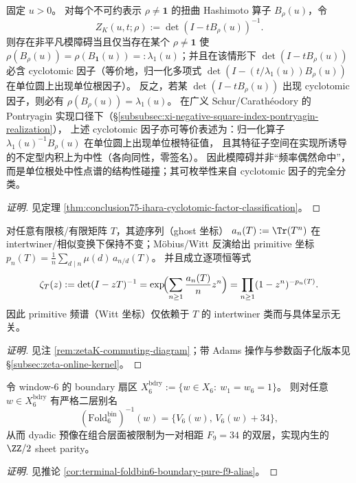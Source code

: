\begin{conclusion}\label{con:xi-terminal-mod-obstruction-cyclotomic}
固定 \(u>0\)。
对每个不可约表示 \(\rho\neq\mathbf 1\) 的扭曲 Hashimoto 算子 \(B_\rho(u)\)，令
\[
Z_K(u,t;\rho):=\det(I-tB_\rho(u))^{-1}.
\]
则存在非平凡模障碍当且仅当存在某个 \(\rho\neq\mathbf 1\) 使 \(\rho(B_\rho(u))=\rho(B_{\mathbf 1}(u))=:\lambda_1(u)\)；并且在该情形下 \(\det(I-tB_\rho(u))\) 必含 cyclotomic 因子（等价地，归一化多项式 \(\det(I-(t/\lambda_1(u))B_\rho(u))\) 在单位圆上出现单位根因子）。
反之，若某 \(\det(I-tB_\rho(u))\) 出现 cyclotomic 因子，则必有 \(\rho(B_\rho(u))=\lambda_1(u)\)。
在广义 Schur/Carath\'eodory 的 Pontryagin 实现口径下（\S\ref{subsubsec:xi-negative-square-index-pontryagin-realization}），
上述 cyclotomic 因子亦可等价表述为：归一化算子 \(\lambda_1(u)^{-1}B_\rho(u)\) 在单位圆上出现单位根特征值，
且其特征子空间在实现所诱导的不定型内积上为中性（各向同性，零签名）。
因此模障碍并非“频率偶然命中”，而是单位根处中性点谱的结构性碰撞；其可枚举性来自 cyclotomic 因子的完全分类。
\end{conclusion}
\begin{proof}[证明]
见定理 \ref{thm:conclusion75-ihara-cyclotomic-factor-classification}。
\end{proof}

\begin{conclusion}[Big-Witt/necklace 桥包的严格交换与函子性：\texorpdfstring{$\zeta=\mathrm{Euler}\circ\mathrm{Mob}\circ\mathrm{TrSeq}$}{zeta=Euler o Mob o TrSeq}]\label{con:xi-terminal-big-witt-functoriality}
对任意有限核/有限矩阵 \(T\)，其迹序列（ghost 坐标）
\(
a_n(T):=\Tr(T^n)
\)
在 intertwiner/相似变换下保持不变；Möbius/Witt 反演给出 primitive 坐标 \(p_n(T)=\frac1n\sum_{d\mid n}\mu(d)\,a_{n/d}(T)\)。
并且成立逐项恒等式
\[
\zeta_T(z):=\det(I-zT)^{-1}
=\exp\!\Bigl(\sum_{n\ge 1}\frac{a_n(T)}{n}z^n\Bigr)
=\prod_{n\ge 1}(1-z^n)^{-p_n(T)}.
\]
因此 primitive 频谱（Witt 坐标）仅依赖于 \(T\) 的 intertwiner 类而与具体呈示无关。
\end{conclusion}
\begin{proof}[证明]
见注 \ref{rem:zetaK-commuting-diagram}；带 Adams 操作与参数函子化版本见 \S\ref{subsec:zeta-online-kernel}。
\end{proof}

\begin{conclusion}[window-\(6\) 边界态的 \texorpdfstring{$\ZZ/2$}{Z/2} sheet parity：二层别名门户由 \texorpdfstring{$F_9=34$}{F9=34} 唯一承载]\label{con:xi-terminal-window6-bdry-sheet-parity}
令 window-\(6\) 的 boundary 扇区
\(
X^{\mathrm{bdry}}_6:=\{w\in X_6:\ w_1=w_6=1\}
\)。
则对任意 \(w\in X^{\mathrm{bdry}}_6\) 有严格二层别名
\[
(\mathrm{Fold}^{\mathrm{bin}}_6)^{-1}(w)=\{V_6(w),\,V_6(w)+34\},
\]
从而 dyadic 预像在组合层面被限制为一对相距 \(F_9=34\) 的双层，实现内生的 \(\ZZ/2\) sheet parity。
\end{conclusion}
\begin{proof}[证明]
见推论 \ref{cor:terminal-foldbin6-boundary-pure-f9-alias}。
\end{proof}

